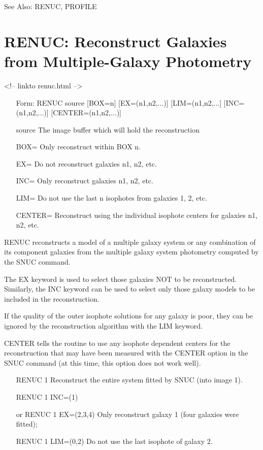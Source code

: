 See Also: RENUC, PROFILE


\section{RENUC: Reconstruct Galaxies from Multiple-Galaxy Photometry}
\begin{rawhtml}
<!-- linkto renuc.html -->
\end{rawhtml}
\begin{itemize} 
  \item[Form: RENUC source {[BOX=n]} {[EX=(n1,n2,...)]} {[LIM=(n1,n2,...]}
       {[INC=(n1,n2,...)]} {[CENTER=(n1,n2,...)]}\hfill]{}
  \item[source]{The image buffer which will hold the reconstruction}
  \item[BOX=]{Only reconstruct within BOX n.}
  \item[EX=]{Do not reconstruct galaxies n1, n2, etc.}
  \item[INC=]{Only reconstruct galaxies n1, n2, etc.}
  \item[LIM=]{Do not use the last n isophotes from galaxies 1, 2, etc.}
  \item[CENTER=]{Reconstruct using the individual isophote centers for
       galaxies n1, n2, etc.}
\end{itemize} 

RENUC reconstructs a model of a multiple galaxy system or any combination
of its component galaxies from the multiple galaxy system photometry
computed by the SNUC command.

The EX keyword is used to select those galaxies NOT to be reconstructed.
Similarly, the INC keyword can be used to select only those galaxy models
to be included in the reconstruction.

If the quality of the outer isophote solutions for any galaxy is poor, they
can be ignored by the reconstruction algorithm with the LIM keyword.

CENTER tells the routine to use any isophote dependent centers for the
reconstruction that may have been measured with the CENTER option in the
SNUC command (at this time, this option does not work well).

\begin{itemize}
  \item[RENUC 1\hfill]{Reconstruct the entire system fitted by SNUC (into
       image 1).}

  \item[RENUC 1 INC=(1) \hfill]{}

  \item[or RENUC 1 EX=(2,3,4)\hfill]{Only reconstruct galaxy 1 (four
       galaxies were fitted);}

  \item[RENUC 1 LIM=(0,2)\hfill]{Do not use the last isophote of galaxy 2.}
\end{itemize} 

